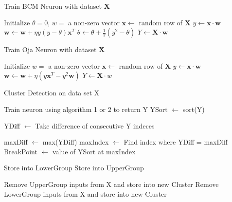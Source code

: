 \documentclass[10pt,twoside]{article}
\begin{document}
\begin{algorithm}
\caption{Train BCM Neuron with dataset $\mathbf{X}$}
\begin{algorithmic} 
\STATE Initialize $\theta = 0$, $w =$ a non-zero vector
\STATE $\mathbf{x} \leftarrow$ random row of $\mathbf{X}$
\STATE $y \leftarrow \mathbf{x} \cdot \mathbf{w}$
\STATE $\mathbf{w} \leftarrow \mathbf{w} + \eta y (y - \theta)  \mathbf{x}^T$
\STATE $\theta \leftarrow \theta + \frac{1}{\tau} (y^2 - \theta)$
\ENDFOR
\STATE $Y \leftarrow \mathbf{X} \cdot \mathbf{w}$
\end{algorithmic}
\end{algorithm}

\begin{algorithm}
\caption{Train Oja Neuron with dataset $\mathbf{X}$}
\begin{algorithmic} 
\STATE Initialize $w =$ a non-zero vector
\STATE $\mathbf{x} \leftarrow$ random row of $\mathbf{X}$
\STATE $y \leftarrow \mathbf{x} \cdot \mathbf{w}$
\STATE $\mathbf{w} \leftarrow \mathbf{w} + \eta (y\mathbf{x}^T -  y^2 \mathbf{w})$
\ENDFOR
\STATE $Y \leftarrow \mathbf{X} \cdot w$
\end{algorithmic}
\end{algorithm}

\begin{algorithm}
\caption{Cluster Detection on data set X}
\begin{algorithmic} 
\STATE Train neuron using algorithm 1 or 2 to return Y
\STATE YSort $\leftarrow$ sort(Y)

\STATE YDiff $\leftarrow$ Take difference of consecutive Y indeces
\ENDFOR

\STATE maxDiff $\leftarrow$ max(YDiff)
\STATE maxIndex $\leftarrow$ Find index where YDiff = maxDiff
\STATE BreakPoint $\leftarrow$ value of YSort at maxIndex

\STATE Store into LowerGroup
\ELSE
\STATE Store into UpperGroup
\ENDIF

\STATE Remove UpperGroup inputs from X and store into new Cluster
\ELSE
\STATE Remove LowerGroup inputs from X and store into new Cluster
\ENDIF
 
\ENDFOR
\ENDFOR
\end{algorithmic}
\end{algorithm}

\end{document}
